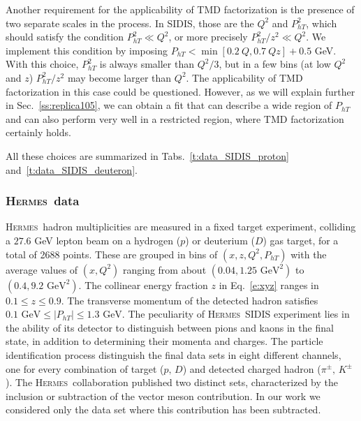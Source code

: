 \documentclass[aps,preprintnumbers,showpacs,nofootinbib,superscriptaddress,floatfix]{revtex4}
\newcommand{\hermes}{\textsc{Hermes}}
\begin{document}
Another requirement for the applicability of TMD factorization is the presence
of two separate scales in the process. In SIDIS, those are the $Q^2$ and
$P_{hT}^2$, which should satisfy the condition $P_{hT}^2 \ll Q^2$, or more
precisely  $P_{hT}^2/z^2 \ll Q^2$. 
We implement this condition by imposing 
$P_{hT} < \min[0.2\ Q, 0.7\ Qz] + 0.5$ GeV.
With this choice, $P_{hT}^2$ is always smaller than $Q^2/3$, but in a few 
bins (at low $Q^2$ and $z$) $P_{hT}^2/z^2$ may become larger
than $Q^2$. The applicability of TMD factorization in this case could be
questioned. However, as we will explain further in Sec.~\ref{ss:replica105},
we can obtain a fit that can describe a wide region of $P_{hT}$ and can also
perform very well in a restricted region,  where TMD factorization
certainly holds.

All these choices are summarized in Tabs.~\ref{t:data_SIDIS_proton} and~\ref{t:data_SIDIS_deuteron}.

\subsubsection{\hermes\ data}
\label{sss:hermes}

\hermes\ hadron multiplicities are measured in a fixed target experiment,
colliding a $27.6$ GeV lepton beam on a hydrogen ($p$) or deuterium ($D$) gas
target, for a total of 2688 points.
These are grouped in bins of $(x,z,Q^2,P_{hT})$ with the average values of $(x,Q^2)$ ranging from about $(0.04, 1.25\text{ GeV}^2)$ to $(0.4, 9.2\text{ GeV}^2)$. 
The collinear energy fraction $z$ in Eq.~\eqref{e:xyz} ranges in $0.1\leq z\leq 0.9$. The transverse momentum of the detected hadron satisfies $0.1 \text{ GeV} \leq \vert P_{hT} \vert \leq 1.3 \text{ GeV}$.
The peculiarity of \hermes\ SIDIS experiment lies in the ability of its detector to distinguish between pions and kaons in the final state, in addition to determining their momenta and charges.
The particle identification process distinguish the final data sets in eight
different channels, one for every combination of target ($p,\,D$) and detected
charged hadron ($\pi^\pm, \,  K^\pm$ ). The
\hermes\ collaboration published two distinct sets, characterized by the inclusion or subtraction of the vector meson contribution. In our work we considered only the data set where this contribution has been subtracted. 
\end{document}
